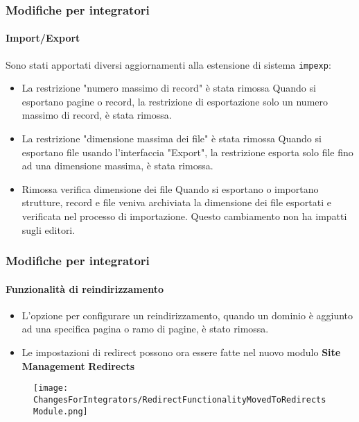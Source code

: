 \begin{frame}[fragile]
	\frametitle{Modifiche per integratori}
	\framesubtitle{Import/Export}

	Sono stati apportati diversi aggiornamenti alla estensione di sistema \texttt{impexp}:

	\begin{itemize}
		\item La restrizione "numero massimo di record" è stata rimossa\newline
			\smaller
				Quando si esportano pagine o record, la restrizione di esportazione
				solo un numero massimo di record, è stata rimossa.
			\normalsize

		\item La restrizione "dimensione massima dei file" è stata rimossa\newline
			\smaller
				Quando si esportano file usando l'interfaccia "Export", la
				restrizione esporta solo file fino ad una dimensione massima,
				è stata rimossa.
			\normalsize

		\item Rimossa verifica dimensione dei file \newline
			\smaller
				Quando si esportano o importano strutture, record e file veniva archiviata
				la dimensione dei file esportati e verificata nel processo di importazione.
				Questo cambiamento non ha impatti sugli editori.
			\normalsize

	\end{itemize}

\end{frame}


\begin{frame}[fragile]
	\frametitle{Modifiche per integratori}
	\framesubtitle{Funzionalità di reindirizzamento}

	\begin{itemize}
		\item L'opzione per configurare un reindirizzamento, quando un dominio è aggiunto ad una specifica
			pagina o ramo di pagine, è stato rimossa.
		\item Le impostazioni di redirect possono ora essere fatte nel nuovo modulo\newline
			\textbf{Site Management} \textrightarrow \textbf{Redirects}
	\end{itemize}

	\begin{figure}
		\texttt{[image: ChangesForIntegrators/RedirectFunctionalityMovedToRedirectsModule.png]}
	\end{figure}

\end{frame}

